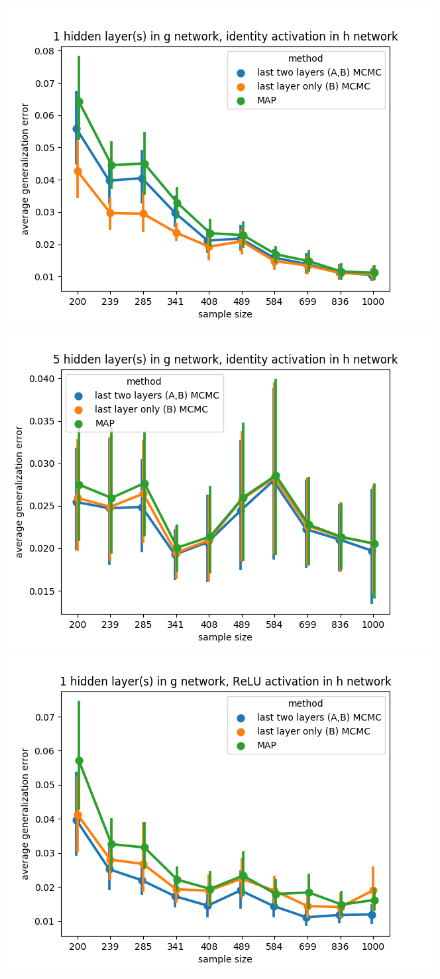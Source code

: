 \documentclass[11pt]{article}
\numberwithin{equation}{section}
\theoremstyle{plain}
\theoremstyle{definition}
\begin{document}
\newpage

\begin{figure}[t!]
	\begin{center}
		\includegraphics[scale=0.45]{taskid0.png}
		\includegraphics[scale=0.45]{taskid1.png}
		\includegraphics[scale=0.45]{taskid2.png}

\end{center}
\end{figure}
\end{document}
